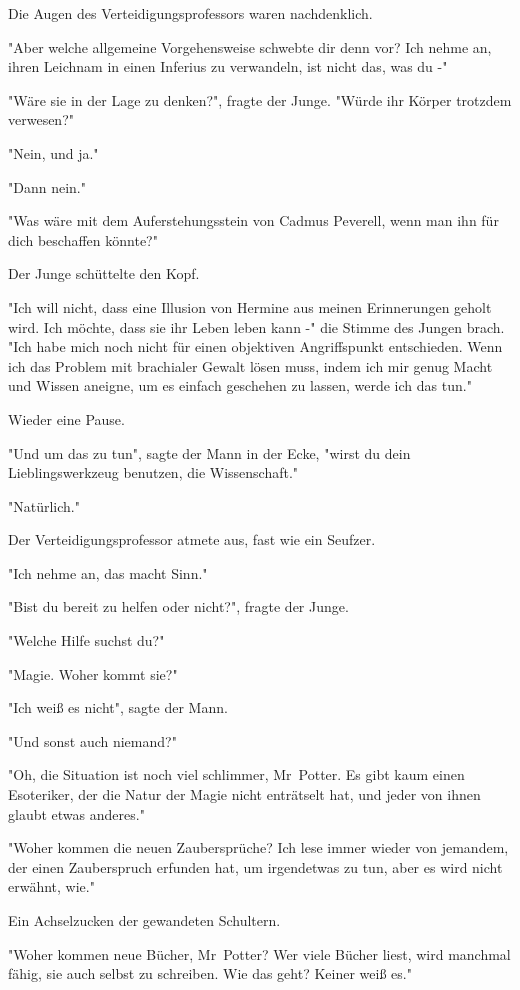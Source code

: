{Die Augen des Verteidigungsprofessors waren nachdenklich.

"Aber welche allgemeine Vorgehensweise schwebte dir denn vor? Ich nehme an, ihren Leichnam in einen Inferius zu verwandeln, ist nicht das, was du -"

"Wäre sie in der Lage zu denken?", fragte der Junge. "Würde ihr Körper trotzdem verwesen?"

"Nein, und ja."

"Dann nein."

"Was wäre mit dem Auferstehungsstein von Cadmus Peverell, wenn man ihn für dich beschaffen könnte?"

Der Junge schüttelte den Kopf.

"Ich will nicht, dass eine Illusion von Hermine aus meinen Erinnerungen geholt wird. Ich möchte, dass sie ihr Leben leben kann -" die Stimme des Jungen brach. "Ich habe mich noch nicht für einen objektiven Angriffspunkt entschieden. Wenn ich das Problem mit brachialer Gewalt lösen muss, indem ich mir genug Macht und Wissen aneigne, um es einfach geschehen zu lassen, werde ich das tun."

Wieder eine Pause.

"Und um das zu tun", sagte der Mann in der Ecke, "wirst du dein Lieblingswerkzeug benutzen, die Wissenschaft."

"Natürlich."

Der Verteidigungsprofessor atmete aus, fast wie ein Seufzer.

"Ich nehme an, das macht Sinn."

"Bist du bereit zu helfen oder nicht?", fragte der Junge.

"Welche Hilfe suchst du?"

"Magie. Woher kommt sie?"

"Ich weiß es nicht", sagte der Mann.

"Und sonst auch niemand?"

"Oh, die Situation ist noch viel schlimmer, Mr~Potter. Es gibt kaum einen Esoteriker, der die Natur der Magie nicht enträtselt hat, und jeder von ihnen glaubt etwas anderes."

"Woher kommen die neuen Zaubersprüche? Ich lese immer wieder von jemandem, der einen Zauberspruch erfunden hat, um irgendetwas zu tun, aber es wird nicht erwähnt, wie."

Ein Achselzucken der gewandeten Schultern.

"Woher kommen neue Bücher, Mr~Potter? Wer viele Bücher liest, wird manchmal fähig, sie auch selbst zu schreiben. Wie das geht? Keiner weiß es."

}

